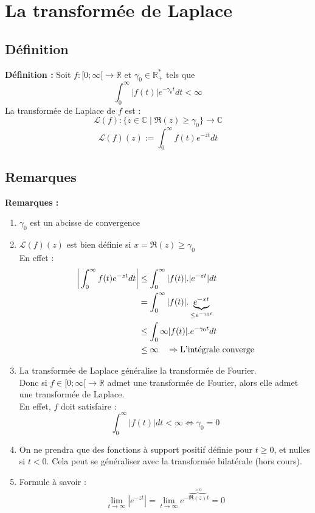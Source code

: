 \section{La transformée de Laplace}
\subsection{Définition}
\textbf{Définition :} Soit $f : [0;\infty[ \to \mathbb{R}$ et $\gamma_0 \in \mathbb{R}^*_+$ tels que
$$\int_0^{\infty}|f(t)|e^{-\gamma_0 t}dt < \infty$$
La transformée de Laplace de $f$ est :
$$\mathcal{L}(f) : \{z \in \mathbb{C} \mid \Re(z) \geq \gamma_0 \} \to \mathbb{C}$$
$$\mathcal{L}(f)(z) := \int_0^{\infty}f(t)e^{-zt}dt$$

\subsection{Remarques}
\textbf{Remarques :}
\begin{enumerate}
    \item $\gamma_0$ est un abcisse de convergence
    \item $\mathcal{L}(f)(z)$ est bien définie si $x = \Re(z) \geq \gamma_0$ \\
    En effet :
    \begin{align*}
        \bigg{|} \int_0^{\infty}f(t)e^{-zt}dt \bigg{|} &\leq \int_0^{\infty}|f(t)|.|e^{-zt}|dt \\
        &= \int_0^{\infty}|f(t)|.\underbrace{e^{-xt}}_{\leq e^{-\gamma_0 t}} \\
        &\leq \int_0{\infty}|f(t)|.e^{-\gamma_0 t}dt \\
        &\leq \infty \quad \Rightarrow \text{L'intégrale converge}
    \end{align*}
    \item La transformée de Laplace généralise la transformée de Fourier. \\
    Donc si $f \in [0;\infty[ \to \mathbb{R}$ admet une transformée de Fourier, alors elle admet une transformée de Laplace. \\
    En effet, $f$ doit satisfaire : 
    $$\int_0^{\infty}|f(t)|dt < \infty \Leftrightarrow \gamma_0 = 0$$
    \item On ne prendra que des fonctions à support positif définie pour $t \geq 0$, et nulles si $t < 0$. Cela peut se généraliser avec la transformée bilatérale (hors cours).
    \item Formule à savoir :
    $$\lim_{t \to \infty}|e^{-zt}| = \lim_{t \to \infty}e^{-\overbrace{\Re(z)}^{>0}t} = 0$$
\end{enumerate}

